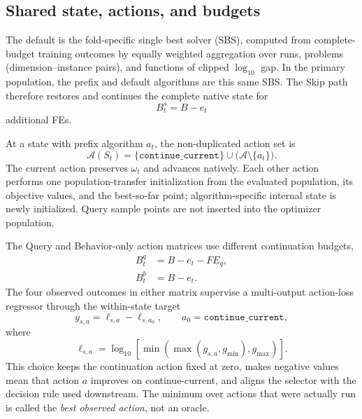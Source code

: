 \subsection{Shared state, actions, and budgets}

The default is the fold-specific single best solver (SBS), computed from
complete-budget training outcomes by equally weighted aggregation over runs,
problems (dimension--instance pairs), and functions of clipped
$\log_{10}$ gap.  In the primary population, the prefix and default algorithms
are this same SBS.  The Skip path therefore restores and continues the complete
native state for
\begin{equation}
  B_t^{s}=B-e_t
  \label{eq:skip-budget}
\end{equation}
additional FEs.

At a state with prefix algorithm $a_t$, the non-duplicated action set is
\begin{equation}
  \mathcal{A}(S_t)
  =\{\texttt{continue\_current}\}
   \cup\bigl(\mathcal{A}\setminus\{a_t\}\bigr).
  \label{eq:state-action-set}
\end{equation}
The current action preserves $\omega_t$ and advances natively.  Each other
action performs one population-transfer initialization from the evaluated
population, its objective values, and the best-so-far point; algorithm-specific
internal state is newly initialized.  Query sample points are not inserted into
the optimizer population.

The Query and Behavior-only action matrices use different continuation
budgets,
\begin{align}
  B_t^q &= B-e_t-FE_q,
  \label{eq:query-budget}\\
  B_t^b &= B-e_t.
  \label{eq:behavior-budget}
\end{align}
The four observed outcomes in either matrix supervise a multi-output action-loss
regressor through the within-state target
\begin{equation}
  y_{s,a}
  =\ell_{s,a}-\ell_{s,a_0},
  \qquad
  a_0=\texttt{continue\_current},
  \label{eq:selector-target-transform}
\end{equation}
where
\begin{equation}
  \ell_{s,a}
  =\log_{10}\!\left[
    \min\!\left(\max(g_{s,a},g_{\min}),g_{\max}\right)
  \right].
  \label{eq:selector-target-loggap}
\end{equation}
This choice keeps the continuation action fixed at zero, makes negative values
mean that action $a$ improves on continue-current, and aligns the selector
with the decision rule used downstream.  The minimum over actions that were
actually run is called the \emph{best observed action}, not an oracle.

